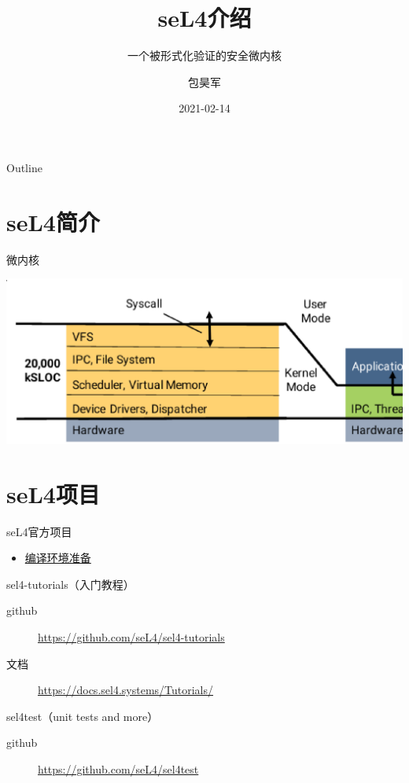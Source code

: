 \documentclass[presentation,dvipdfmx,CJKbookmarks]{beamer}
\date{2021-02-14}
\begin{document}
\begin{CJK*}{UTF8}{simsun}

\title{seL4\thinspace 介绍}
\subtitle{\thinspace 一个被形式化验证的安全微内核}
\author{包昊军}

\maketitle
\begin{frame}{Outline}
\tableofcontents
\end{frame}

\CJKtilde

\section{seL4\thinspace 简介}
\label{sec:org4d831e3}
\begin{frame}[label={sec:org90830e8}]{微内核}
\begin{center}
\includegraphics[width=.9\linewidth]{./images/micro-kernel-structure.ps}
\end{center}
\end{frame}

\section{seL4\thinspace 项目}
\label{sec:org845ae00}
\begin{frame}[label={sec:orge8446d0}]{seL4\thinspace 官方项目}
\begin{itemize}
\item \href{https://docs.sel4.systems/projects/buildsystem/host-dependencies.html}{编译环境准备}
\end{itemize}
\begin{block}{sel4-tutorials（入门教程）}
\begin{description}
\item[{github}] \url{https://github.com/seL4/sel4-tutorials}
\item[{文档}] \url{https://docs.sel4.systems/Tutorials/}
\end{description}
\end{block}
\begin{block}{sel4test（unit tests and more）}
\begin{description}
\item[{github}] \url{https://github.com/seL4/sel4test}
\end{description}
\end{block}


\end{frame}
\end{CJK*}
\end{document}
